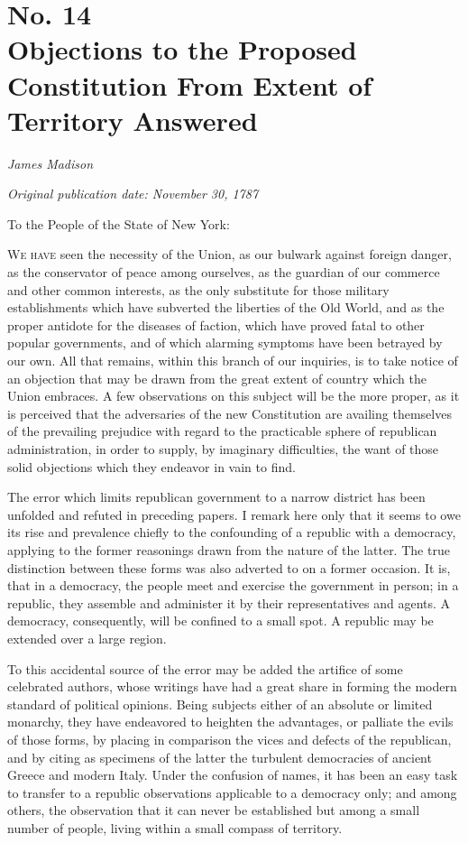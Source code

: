 \chapter[No. 14: Objections to the Proposed Constitution From Extent of Territory Answered]{No. 14\\ {\small Objections to the Proposed Constitution From Extent of Territory Answered}}

\textit{James Madison}

\textit{Original publication date: November 30, 1787}
\vspace{1cm}

To the People of the State of New York:
\vspace{.4cm}

\textsc{We have} seen the necessity of the Union, as our bulwark against foreign danger, as the conservator of peace among ourselves, as the guardian of our commerce and other common interests, as the only substitute for those military establishments which have subverted the liberties of the Old World, and as the proper antidote for the diseases of faction, which have proved fatal to other popular governments, and of which alarming symptoms have been betrayed by our own. 
All that remains, within this branch of our inquiries, is to take notice of an objection that may be drawn from the great extent of country which the Union embraces. 
A few observations on this subject will be the more proper, as it is perceived that the adversaries of the new Constitution are availing themselves of the prevailing prejudice with regard to the practicable sphere of republican administration, in order to supply, by imaginary difficulties, the want of those solid objections which they endeavor in vain to find.

The error which limits republican government to a narrow district has been unfolded and refuted in preceding papers. 
I remark here only that it seems to owe its rise and prevalence chiefly to the confounding of a republic with a democracy, applying to the former reasonings drawn from the nature of the latter. 
The true distinction between these forms was also adverted to on a former occasion. 
It is, that in a democracy, the people meet and exercise the government in person; in a republic, they assemble and administer it by their representatives and agents. 
A democracy, consequently, will be confined to a small spot. 
A republic may be extended over a large region.

To this accidental source of the error may be added the artifice of some celebrated authors, whose writings have had a great share in forming the modern standard of political opinions. 
Being subjects either of an absolute or limited monarchy, they have endeavored to heighten the advantages, or palliate the evils of those forms, by placing in comparison the vices and defects of the republican, and by citing as specimens of the latter the turbulent democracies of ancient Greece and modern Italy. 
Under the confusion of names, it has been an easy task to transfer to a republic observations applicable to a democracy only; and among others, the observation that it can never be established but among a small number of people, living within a small compass of territory.


